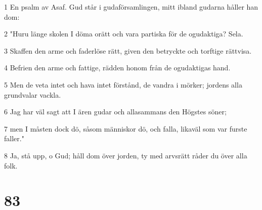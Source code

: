 \par 1 En psalm av Asaf. Gud står i gudaförsamlingen, mitt ibland gudarna håller han dom:
\par 2 "Huru länge skolen I döma orätt och vara partiska för de ogudaktiga? Sela.
\par 3 Skaffen den arme och faderlöse rätt, given den betryckte och torftige rättvisa.
\par 4 Befrien den arme och fattige, rädden honom från de ogudaktigas hand.
\par 5 Men de veta intet och hava intet förstånd, de vandra i mörker; jordens alla grundvalar vackla.
\par 6 Jag har väl sagt att I ären gudar och allasammans den Högstes söner;
\par 7 men I måsten dock dö, såsom människor dö, och falla, likaväl som var furste faller."
\par 8 Ja, stå upp, o Gud; håll dom över jorden, ty med arvsrätt råder du över alla folk.

\chapter{83}

